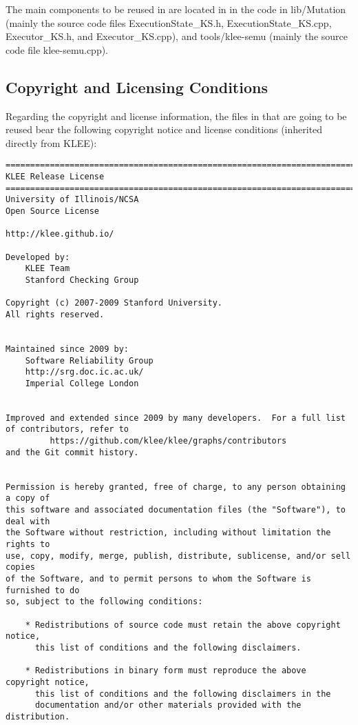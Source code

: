 The main components to be reused in \SEMUS are located in in the code in lib/Mutation (mainly the source code files ExecutionState\_KS.h, ExecutionState\_KS.cpp, Executor\_KS.h, and Executor\_KS.cpp), and tools/klee-semu (mainly the source code file klee-semu.cpp).

\subsection{Copyright and Licensing Conditions}

Regarding the copyright and license information, the files in \SEMU that are going to be reused bear the following copyright notice and license conditions (inherited directly from KLEE):

\begin{lstlisting}[language={}]
==============================================================================
KLEE Release License
==============================================================================
University of Illinois/NCSA
Open Source License

http://klee.github.io/

Developed by:
    KLEE Team
    Stanford Checking Group

Copyright (c) 2007-2009 Stanford University.
All rights reserved.


Maintained since 2009 by:
    Software Reliability Group
    http://srg.doc.ic.ac.uk/
    Imperial College London


Improved and extended since 2009 by many developers.  For a full list
of contributors, refer to
         https://github.com/klee/klee/graphs/contributors
and the Git commit history.


Permission is hereby granted, free of charge, to any person obtaining a copy of
this software and associated documentation files (the "Software"), to deal with
the Software without restriction, including without limitation the rights to
use, copy, modify, merge, publish, distribute, sublicense, and/or sell copies
of the Software, and to permit persons to whom the Software is furnished to do
so, subject to the following conditions:

    * Redistributions of source code must retain the above copyright notice,
      this list of conditions and the following disclaimers.

    * Redistributions in binary form must reproduce the above copyright notice,
      this list of conditions and the following disclaimers in the
      documentation and/or other materials provided with the distribution.


\end{lstlisting}

